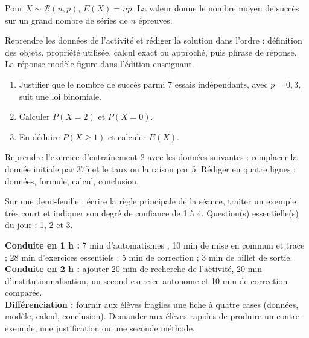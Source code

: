 \begin{traceecrite}Pour $X\sim\mathcal B(n,p)$, $E(X)=np$. La valeur donne le nombre moyen de succès sur un grand nombre de séries de $n$ épreuves.\end{traceecrite}

\begin{exemple}
Reprendre les données de l'activité et rédiger la solution dans l'ordre : définition des objets, propriété utilisée, calcul exact ou approché, puis phrase de réponse. La réponse modèle figure dans l'édition enseignant.
\end{exemple}

\begin{exercice}[-- essentiel]
\begin{enumerate}\item Justifier que le nombre de succès parmi $7$ essais indépendants, avec $p=0{,}3$, suit une loi binomiale.\item Calculer $P(X=2)$ et $P(X=0)$.\item En déduire $P(X\geq1)$ et calculer $E(X)$.\end{enumerate}
\end{exercice}


\begin{dm}Reprendre l'exercice d'entraînement 2 avec les données suivantes : remplacer la donnée initiale par $375$ et le taux ou la raison par $5$. Rédiger en quatre lignes : données, formule, calcul, conclusion.\end{dm}

\begin{sortie}Sur une demi-feuille : écrire la règle principale de la séance, traiter un exemple très court et indiquer son degré de confiance de 1 à 4. Question(s) essentielle(s) du jour : 1, 2 et 3.\end{sortie}

\ifprof
\begin{methode}
\textbf{Conduite en 1 h :} 7 min d'automatismes ; 10 min de mise en commun et trace ; 28 min d'exercices essentiels ; 5 min de correction ; 3 min de billet de sortie.\\
\textbf{Conduite en 2 h :} ajouter 20 min de recherche de l'activité, 20 min d'institutionnalisation, un second exercice autonome et 10 min de correction comparée.\\
\textbf{Différenciation :} fournir aux élèves fragiles une fiche à quatre cases (données, modèle, calcul, conclusion). Demander aux élèves rapides de produire un contre-exemple, une justification ou une seconde méthode.
\end{methode}
\fi

